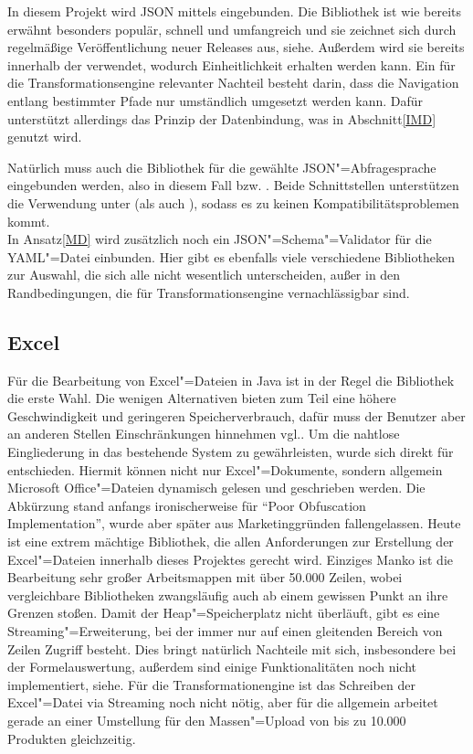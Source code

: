 In diesem Projekt wird JSON mittels  eingebunden. Die Bibliothek ist wie bereits erwähnt besonders populär, schnell und umfangreich und sie zeichnet sich durch regelmäßige Veröffentlichung neuer Releases aus, siehe\nbs\cite{jackson}. Außerdem wird sie bereits innerhalb der  verwendet, wodurch Einheitlichkeit erhalten werden kann. Ein für die Transformationsengine relevanter Nachteil besteht darin, dass die Navigation entlang bestimmter Pfade nur umständlich umgesetzt werden kann. Dafür unterstützt  allerdings das Prinzip der Datenbindung, was in Abschnitt\nbs\ref{IMD} genutzt wird. 

Natürlich muss auch die Bibliothek für die gewählte JSON"=Abfragesprache eingebunden werden, also in diesem Fall  bzw. . Beide Schnittstellen unterstützen die Verwendung unter  (als auch ), sodass es zu keinen Kompatibilitätsproblemen kommt.\\
In Ansatz\nbs\ref{MD} wird zusätzlich noch ein JSON"=Schema"=Validator für die YAML"=Datei einbunden. Hier gibt es ebenfalls viele verschiedene Bibliotheken zur Auswahl, die sich alle nicht wesentlich unterscheiden, außer in den Randbedingungen, die für Transformationsengine vernachlässigbar sind.

\subsection{Excel} \label{BibExcel}
Für die Bearbeitung von Excel"=Dateien in Java ist in der Regel die Bibliothek  die erste Wahl. Die wenigen Alternativen bieten zum Teil eine höhere Geschwindigkeit und geringeren Speicherverbrauch, dafür muss der Benutzer aber an anderen Stellen Einschränkungen hinnehmen vgl.\nbs\cite{poi:alt}. Um die nahtlose Eingliederung in das bestehende System zu gewährleisten, wurde sich direkt für  entschieden. Hiermit können nicht nur Excel"=Dokumente, sondern allgemein Microsoft Office"=Dateien dynamisch gelesen und geschrieben werden. Die Abkürzung  stand anfangs ironischerweise für "`Poor Obfuscation Implementation"', wurde aber später aus Marketinggründen fallengelassen. Heute ist  eine extrem mächtige Bibliothek, die allen Anforderungen zur Erstellung der Excel"=Dateien innerhalb dieses Projektes gerecht wird. Einziges Manko ist die Bearbeitung sehr großer Arbeitsmappen mit über 50.000 Zeilen, wobei vergleichbare Bibliotheken zwangsläufig auch ab einem gewissen Punkt an ihre Grenzen stoßen. Damit der Heap"=Speicherplatz nicht überläuft, gibt es eine Streaming"=Erweiterung, bei der immer nur auf einen gleitenden Bereich von Zeilen Zugriff besteht. Dies bringt natürlich Nachteile mit sich, insbesondere bei der Formelauswertung, außerdem sind einige Funktionalitäten noch nicht implementiert, siehe\nbs\cite{poi}. Für die Transformationengine ist das Schreiben der Excel"=Datei via Streaming noch nicht nötig, aber für die  allgemein arbeitet  gerade an einer Umstellung für den Massen"=Upload von bis zu 10.000 Produkten gleichzeitig.

